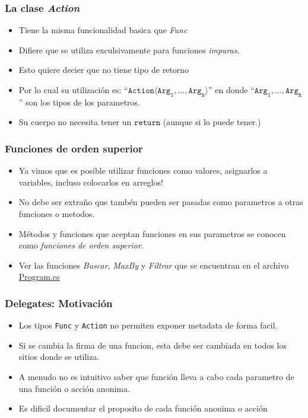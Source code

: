 \documentclass{beamer}
\begin{document}
\begin{frame}
    \frametitle{La clase \emph{Action}}
    \begin{itemize}
        \item{Tiene la misma funcionalidad basica que \emph{Func}}
        \item{Difiere que se utiliza exculsivamente para funciones \emph{impuras}.}
        \item{Esto quiere decier que no tiene tipo de retorno}
        \item{Por lo cual su utilizaci\'on es: ``$\mathtt{Action}\langle\mathtt{Arg_1},\ldots,\mathtt{Arg_n}\rangle$''
        en donde ``$\mathtt{Arg_1},\ldots,\mathtt{Arg_n}$'' son los tipos de los parametros.}
        \item{Su cuerpo no necesita tener un $\mathtt{return}$ (aunque si lo puede tener.)}
    \end{itemize}
\end{frame}

\begin{frame}
    \frametitle{Funciones de orden superior}
    \begin{itemize}
        \item{Ya vimos que es posible utilizar funciones como valores,
        asignarlos a variables, incluso colocarlos en arreglos!}
        \item{No debe ser extra\~no que tamb\'en pueden ser pasadas como
        parametros a otras funciones o metodos.}
        \item{M\'etodos y funciones que aceptan funciones en sus parametros
        se conocen como \emph{funciones de orden superior}}.
        \item{Ver las funciones \emph{Buscar}, \emph{MaxBy} y \emph{Filtrar}
        que se encuentran en el archivo \href{run:../Ejemplos/Lambdas/Program.cs}{Program.cs}}
    \end{itemize}
\end{frame}

\begin{frame}
    \frametitle{Delegates: Motivaci\'on}
    \begin{itemize}
        \item{Los tipos \texttt{Func} y \texttt{Action} no permiten exponer
        metadata de forma facil.}
        \item{Si se cambia la firma de una funcion, esta debe ser cambiada
        en todos los sitios donde se utiliza.}
        \item{A menudo no es intuitivo saber que funci\'on lleva a cabo
        cada parametro de una funci\'on o acci\'on anonima.}
        \item{Es dificil documentar el proposito de cada funci\'on anonima o acci\'on}
    \end{itemize}
\end{frame}
\end{document}
